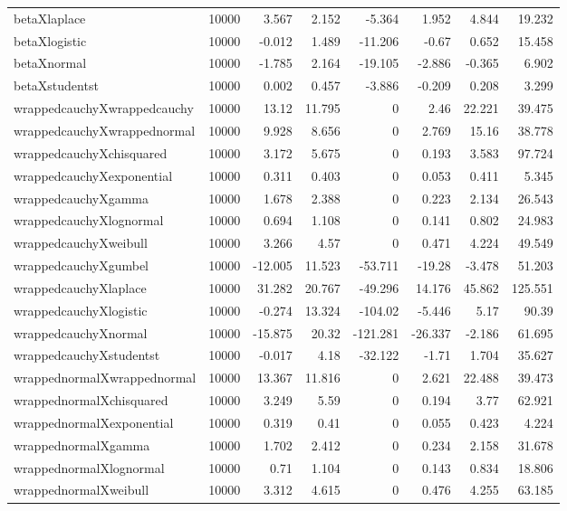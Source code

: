 \begin{table}[!htbp]
{\begin{tabular}{lrrrrrrr}
betaXlaplace & 10000 & 3.567 & 2.152 & -5.364 & 1.952 & 4.844 & 19.232 \\ 
betaXlogistic & 10000 & -0.012 & 1.489 & -11.206 & -0.67 & 0.652 & 15.458 \\ 
betaXnormal & 10000 & -1.785 & 2.164 & -19.105 & -2.886 & -0.365 & 6.902 \\ 
betaXstudentst & 10000 & 0.002 & 0.457 & -3.886 & -0.209 & 0.208 & 3.299 \\ 
wrappedcauchyXwrappedcauchy & 10000 & 13.12 & 11.795 & 0 & 2.46 & 22.221 & 39.475 \\ 
wrappedcauchyXwrappednormal & 10000 & 9.928 & 8.656 & 0 & 2.769 & 15.16 & 38.778 \\ 
wrappedcauchyXchisquared & 10000 & 3.172 & 5.675 & 0 & 0.193 & 3.583 & 97.724 \\ 
wrappedcauchyXexponential & 10000 & 0.311 & 0.403 & 0 & 0.053 & 0.411 & 5.345 \\ 
wrappedcauchyXgamma & 10000 & 1.678 & 2.388 & 0 & 0.223 & 2.134 & 26.543 \\ 
wrappedcauchyXlognormal & 10000 & 0.694 & 1.108 & 0 & 0.141 & 0.802 & 24.983 \\ 
wrappedcauchyXweibull & 10000 & 3.266 & 4.57 & 0 & 0.471 & 4.224 & 49.549 \\ 
wrappedcauchyXgumbel & 10000 & -12.005 & 11.523 & -53.711 & -19.28 & -3.478 & 51.203 \\ 
wrappedcauchyXlaplace & 10000 & 31.282 & 20.767 & -49.296 & 14.176 & 45.862 & 125.551 \\ 
wrappedcauchyXlogistic & 10000 & -0.274 & 13.324 & -104.02 & -5.446 & 5.17 & 90.39 \\ 
wrappedcauchyXnormal & 10000 & -15.875 & 20.32 & -121.281 & -26.337 & -2.186 & 61.695 \\ 
wrappedcauchyXstudentst & 10000 & -0.017 & 4.18 & -32.122 & -1.71 & 1.704 & 35.627 \\ 
wrappednormalXwrappednormal & 10000 & 13.367 & 11.816 & 0 & 2.621 & 22.488 & 39.473 \\ 
wrappednormalXchisquared & 10000 & 3.249 & 5.59 & 0 & 0.194 & 3.77 & 62.921 \\ 
wrappednormalXexponential & 10000 & 0.319 & 0.41 & 0 & 0.055 & 0.423 & 4.224 \\ 
wrappednormalXgamma & 10000 & 1.702 & 2.412 & 0 & 0.234 & 2.158 & 31.678 \\ 
wrappednormalXlognormal & 10000 & 0.71 & 1.104 & 0 & 0.143 & 0.834 & 18.806 \\ 
wrappednormalXweibull & 10000 & 3.312 & 4.615 & 0 & 0.476 & 4.255 & 63.185 \\ 

\end{tabular}}
\end{table}
